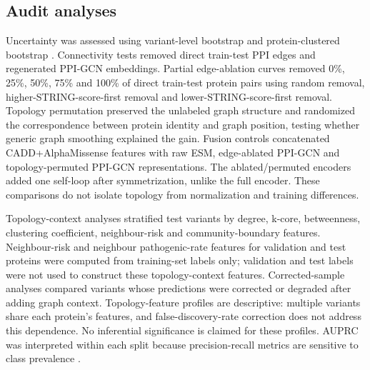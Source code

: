 \documentclass[conference]{IEEEtran}
\newcommand{\CADDAM}{CADD\allowbreak{}+\allowbreak{}AlphaMissense}
\begin{document}
\subsection{Audit analyses}

Uncertainty was assessed using variant-level bootstrap and protein-clustered bootstrap \cite{Efron1993Bootstrap}. Connectivity tests removed direct train-test PPI edges and regenerated PPI-GCN embeddings. Partial edge-ablation curves removed 0\%, 25\%, 50\%, 75\% and 100\% of direct train-test protein pairs using random removal, higher-STRING-score-first removal and lower-STRING-score-first removal. Topology permutation preserved the unlabeled graph structure and randomized the correspondence between protein identity and graph position, testing whether generic graph smoothing explained the gain. Fusion controls concatenated \CADDAM{} features with raw ESM, edge-ablated PPI-GCN and topology-permuted PPI-GCN representations. The ablated/permuted encoders added one self-loop after symmetrization, unlike the full encoder. These comparisons do not isolate topology from normalization and training differences.

Topology-context analyses stratified test variants by degree, k-core, betweenness, clustering coefficient, neighbour-risk and community-boundary features. Neighbour-risk and neighbour pathogenic-rate features for validation and test proteins were computed from training-set labels only; validation and test labels were not used to construct these topology-context features. Corrected-sample analyses compared variants whose predictions were corrected or degraded after adding graph context. Topology-feature profiles are descriptive: multiple variants share each protein's features, and false-discovery-rate correction \cite{Benjamini1995FDR} does not address this dependence. No inferential significance is claimed for these profiles. AUPRC was interpreted within each split because precision-recall metrics are sensitive to class prevalence \cite{Saito2015PrecisionRecall}.
\end{document}
